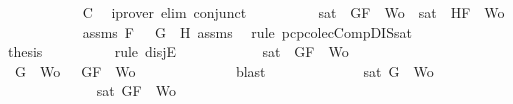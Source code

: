 \begin{isabellebody}
\ \ \ \ \ \ \ \ \ \ \isamarkupfalse%
\ C{}\ \isamarkupfalse%
\ {\isacharparenleft}iprover\ elim{\isacharcolon}\ conjunct{}{\isacharparenright}\isanewline
\ \ \ \ \ \ \ \ \isamarkupfalse%
\ {\isachardoublequoteopen}sat\ {\isacharparenleft}{\isacharbraceleft}\isactrlbold {\isasymnot}\ G{}{\isacharcomma}F{\isacharbraceright}\ {\isasymunion}\ Wo{\isacharparenright}\ {\isasymor}\ sat\ {\isacharparenleft}{\isacharbraceleft}\isactrlbold {\isasymnot}\ H{}{\isacharcomma}F{\isacharbraceright}\ {\isasymunion}\ Wo{\isacharparenright}{\isachardoublequoteclose}\isanewline
\ \ \ \ \ \ \ \ \ \ \isamarkupfalse%
\ assms{\isacharparenleft}{}{\isacharparenright}\ {\isacartoucheopen}F\ {\isacharequal}\ \isactrlbold {\isasymnot}\ {\isacharparenleft}G{}\ \isactrlbold {\isasymand}\ H{}{\isacharparenright}{\isacartoucheclose}\ assms{\isacharparenleft}{}{\isacharcomma}{}{\isacharcomma}{}{\isacharparenright}\ \isamarkupfalse%
\ {\isacharparenleft}rule\ pcp{\isacharunderscore}colecComp{\isacharunderscore}DIS{\isacharunderscore}sat{}{\isacharparenright}\isanewline
\ \ \ \ \ \ \ \ \isamarkupfalse%
\ {\isacharquery}thesis\isanewline
\ \ \ \ \ \ \ \ \isamarkupfalse%
\ {\isacharparenleft}rule\ disjE{\isacharparenright}\isanewline
\ \ \ \ \ \ \ \ \ \ \isamarkupfalse%
\ {\isachardoublequoteopen}sat\ {\isacharparenleft}{\isacharbraceleft}\isactrlbold {\isasymnot}\ G{}{\isacharcomma}F{\isacharbraceright}\ {\isasymunion}\ Wo{\isacharparenright}{\isachardoublequoteclose}\isanewline
\ \ \ \ \ \ \ \ \ \ \isamarkupfalse%
\ {\isachardoublequoteopen}{\isacharbraceleft}\isactrlbold {\isasymnot}\ G{}{\isacharbraceright}\ {\isasymunion}\ Wo\ {\isasymsubseteq}\ {\isacharbraceleft}\isactrlbold {\isasymnot}\ G{}{\isacharcomma}F{\isacharbraceright}\ {\isasymunion}\ Wo{\isachardoublequoteclose}\isanewline
\ \ \ \ \ \ \ \ \ \ \ \ \isamarkupfalse%
\ blast\isanewline
\ \ \ \ \ \ \ \ \ \ \isamarkupfalse%
\ \isamarkupfalse%
\ {\isachardoublequoteopen}sat{\isacharparenleft}{\isacharbraceleft}\isactrlbold {\isasymnot}\ G{}{\isacharbraceright}\ {\isasymunion}\ Wo{\isacharparenright}{\isachardoublequoteclose}\isanewline
\ \ \ \ \ \ \ \ \ \ \ \ \isamarkupfalse%
\ {\isacartoucheopen}sat{\isacharparenleft}{\isacharbraceleft}\isactrlbold {\isasymnot}\ G{}{\isacharcomma}F{\isacharbraceright}\ {\isasymunion}\ Wo{\isacharparenright}{\isacartoucheclose}\ \isamarkupfalse%

\end{isabellebody}
